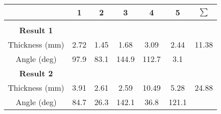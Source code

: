 \documentclass{article}
\begin{document}
    \begin{tabular}{c c c c c c c}
        \toprule
        & 1 & 2 & 3 & 4 & 5 & $\sum$ \\ 
        \midrule\\
        \addlinespace[-2ex]
        \textbf{Result 1} \\
        \addlinespace[1.5ex]
        Thickness (\si{\milli \meter}) & 2.72 & 1.45 & 1.68 & 3.09 & 2.44 & 11.38\\
        \addlinespace[1.5ex]
        Angle (deg) & 97.9 & 83.1 & 144.9 & 112.7 & 3.1 \\
        \bottomrule
        \addlinespace[2ex]
        \textbf{Result 2} \\
        \addlinespace[1.5ex]
        Thickness (\si{\milli \meter}) & 3.91 & 2.61 & 2.59 & 10.49 & 5.28 & 24.88\\
        \addlinespace[1.5ex]
        Angle (deg) & 84.7 & 26.3 & 142.1 & 36.8 & 121.1 \\
        \bottomrule
    \end{tabular}
\end{document}
